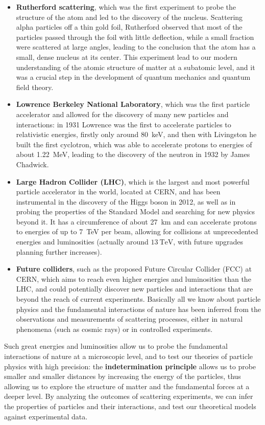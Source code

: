 \begin{itemize}
    \item \textbf{Rutherford scattering}, which was the first experiment to probe the structure of the atom and led to the discovery of the nucleus. Scattering alpha particles off a thin gold foil, Rutherford observed that most of the particles passed through the foil with little deflection, while a small fraction were scattered at large angles, leading to the conclusion that the atom has a small, dense nucleus at its center. This experiment lead to our modern understanding of the atomic structure of matter at a subatomic level, and it was a crucial step in the development of quantum mechanics and quantum field theory.
    \item \textbf{Lowrence Berkeley National Laboratory}, which was the first particle accelerator and allowed for the discovery of many new particles and interactions: in 1931 Lowrence was the first to accelerate particles to relativistic energies, firstly only around \SI{80}{\kilo\electronvolt}, and then with Livingston he built the first cyclotron, which was able to accelerate protons to energies of about \SI{1.22}{\mega\electronvolt}, leading to the discovery of the neutron in 1932 by James Chadwick.
    \item \textbf{Large Hadron Collider (LHC)}, which is the largest and most powerful particle accelerator in the world, located at CERN, and has been instrumental in the discovery of the Higgs boson in 2012, as well as in probing the properties of the Standard Model and searching for new physics beyond it. It has a circumference of about \SI{27}{\kilo\meter} and can accelerate protons to energies of up to \SI{7}{\tera\electronvolt} per beam, allowing for collisions at unprecedented energies and luminosities (actually around \(\SI{13}{\tera\electronvolt}\), with future upgrades planning further increases).
    \item \textbf{Future colliders}, such as the proposed Future Circular Collider (FCC) at CERN, which aims to reach even higher energies and luminosities than the LHC, and could potentially discover new particles and interactions that are beyond the reach of current experiments. Basically all we know about particle physics and the fundamental interactions of nature has been inferred from the observations and measurements of scattering processes, either in natural phenomena (such as cosmic rays) or in controlled experiments.
\end{itemize}
Such great energies and luminosities allow us to probe the fundamental interactions of nature at a microscopic level, and to test our theories of particle physics with high precision: the \textbf{indetermination principle} allows us to probe smaller and smaller distances by increasing the energy of the particles, thus allowing us to explore the structure of matter and the fundamental forces at a deeper level. By analyzing the outcomes of scattering experiments, we can infer the properties of particles and their interactions, and test our theoretical models against experimental data.

